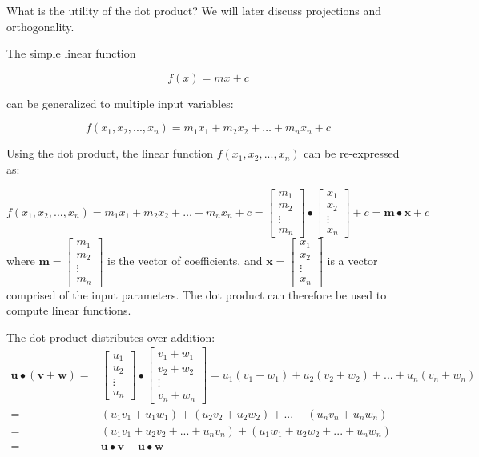 \documentclass{article}
\begin{document}
What is the utility of the dot product? We will later discuss projections and orthogonality. 

The simple linear function 

\[f(x) = mx + c\]

can be generalized to multiple input variables:

\[f(x_1, x_2, ..., x_n) = m_1 x_1 + m_2 x_2 + \dots + m_n x_n + c\]

Using the dot product, the linear function \(f(x_1, x_2, ..., x_n)\) can be re-expressed as:

\[f(x_1, x_2, ..., x_n) = m_1 x_1 + m_2 x_2 + \dots + m_n x_n + c = \begin{bmatrix} m_1 \\ m_2 \\ \vdots \\ m_n \end{bmatrix} \bullet \begin{bmatrix} x_1 \\ x_2 \\ \vdots \\ x_n \end{bmatrix} + c = \mathbf{m} \bullet \mathbf{x} + c\]
where \(\mathbf{m} = \begin{bmatrix} m_1 \\ m_2 \\ \vdots \\ m_n \end{bmatrix}\) is the vector of coefficients, and \(\mathbf{x} = \begin{bmatrix} x_1 \\ x_2 \\ \vdots \\ x_n \end{bmatrix}\) is a vector comprised of the input parameters. The dot product can therefore be used to compute linear functions. 

The dot product distributes over addition:
\begin{align*}
\mathbf{u} \bullet (\mathbf{v} + \mathbf{w}) 
= & \begin{bmatrix} u_1 \\ u_2 \\ \vdots \\ u_n \end{bmatrix} \bullet \begin{bmatrix} v_1 + w_1 \\ v_2 + w_2 \\ \vdots \\ v_n + w_n \end{bmatrix} 
= u_1(v_1 + w_1) + u_2(v_2 + w_2) + ... + u_n(v_n + w_n) \\
= & (u_1 v_1 + u_1 w_1) + (u_2 v_2 + u_2 w_2) + ... + (u_n v_n + u_n w_n) \\
= & (u_1 v_1 + u_2 v_2 + ... + u_n v_n) + (u_1 w_1 + u_2 w_2 + ... + u_n w_n) \\
= & \mathbf{u} \bullet \mathbf{v} + \mathbf{u} \bullet \mathbf{w}
\end{align*}
\end{document}
